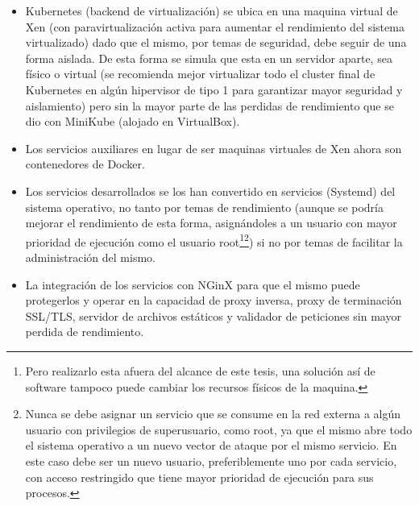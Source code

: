 \begin{itemize}
	\item Kubernetes (backend de virtualización) se ubica en una maquina virtual de Xen (con paravirtualización activa para aumentar el rendimiento del sistema virtualizado) dado que el mismo, por temas de seguridad, debe seguir de una forma aislada. De esta forma se simula que esta en un servidor aparte, sea físico o virtual (se recomienda mejor virtualizar todo el cluster final de Kubernetes en algún hipervisor de tipo 1 para garantizar mayor seguridad y aislamiento) pero sin la mayor parte de las perdidas de rendimiento que se dio con MiniKube (alojado en VirtualBox).
    \item Los servicios auxiliares en lugar de ser maquinas virtuales de Xen ahora son contenedores de Docker.
    \item Los servicios desarrollados se los han convertido en servicios (Systemd) del sistema operativo, no tanto por temas de rendimiento (aunque se podría mejorar el rendimiento de esta forma, asignándoles a un usuario con mayor prioridad de ejecución como el usuario root\footnote{Pero realizarlo esta afuera del alcance de este tesis, una solución así de software tampoco puede cambiar los recursos físicos de la maquina.}\footnote{Nunca se debe asignar un servicio que se consume en la red externa a algún usuario con privilegios de superusuario, como root, ya que el mismo abre todo el sistema operativo a un nuevo vector de ataque por el mismo servicio. En este caso debe ser un nuevo usuario, preferiblemente uno por cada servicio, con acceso restringido que tiene mayor prioridad de ejecución para sus procesos.}) si no por temas de facilitar la administración del mismo.
    \item La integración de los servicios con NGinX para que el mismo puede protegerlos y operar en la capacidad de proxy inversa, proxy de terminación SSL/TLS, servidor de archivos estáticos y validador de peticiones sin mayor perdida de rendimiento.
\end{itemize}

